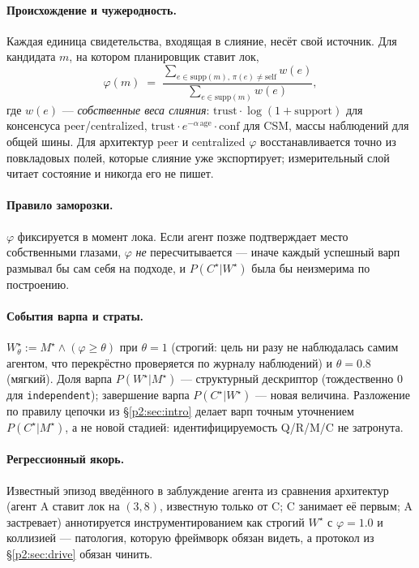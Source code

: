 \documentclass{article}
\newcommand{\method}[1]{\texttt{#1}}
\newcommand{\wstar}{W^{\star}}
\newcommand{\mstar}{M^{\star}}
\newcommand{\cstar}{C^{\star}}
\begin{document}
\paragraph{Происхождение и чужеродность.} Каждая единица
свидетельства, входящая в слияние, несёт свой источник. Для
кандидата $m$, на котором планировщик ставит лок,
\[
\varphi(m) \;=\;
\frac{\sum_{e\in\mathrm{supp}(m),\,\pi(e)\neq\mathrm{self}} w(e)}
     {\sum_{e\in\mathrm{supp}(m)} w(e)},
\]
где $w(e)$ --- \emph{собственные веса слияния}: $\text{trust}\cdot
\log(1{+}\text{support})$ для консенсуса peer/centralized,
$\text{trust}\cdot e^{-\alpha\,\text{age}}\cdot\text{conf}$ для CSM,
массы наблюдений для общей шины. Для архитектур peer и centralized
$\varphi$ восстанавливается точно из повкладовых полей, которые
слияние уже экспортирует; измерительный слой читает состояние и
никогда его не пишет.

\paragraph{Правило заморозки.} $\varphi$ фиксируется в момент лока.
Если агент позже подтверждает место собственными глазами, $\varphi$
\emph{не} пересчитывается --- иначе каждый успешный варп размывал бы
сам себя на подходе, и $P(\cstar|\wstar)$ была бы неизмерима по
построению.

\paragraph{События варпа и страты.} $\wstar_\theta := \mstar \wedge
(\varphi\ge\theta)$ при $\theta{=}1$ (строгий: цель ни разу не
наблюдалась самим агентом, что перекрёстно проверяется по журналу
наблюдений) и $\theta{=}0.8$ (мягкий). Доля варпа $P(\wstar|\mstar)$
--- структурный дескриптор (тождественно $0$ для
\method{independent}); завершение варпа $P(\cstar|\wstar)$ --- новая
величина. Разложение по правилу цепочки из \S\ref{p2:sec:intro} делает
варп точным уточнением $P(\cstar|\mstar)$, а не новой стадией:
идентифицируемость Q/R/M/C не затронута.

\paragraph{Регрессионный якорь.} Известный эпизод введённого в
заблуждение агента из сравнения архитектур (агент A ставит лок на
$(3,8)$, известную только от C; C занимает её первым; A застревает)
аннотируется инструментированием как строгий $\wstar$ с
$\varphi=1.0$ и коллизией --- патология, которую фреймворк обязан
видеть, а протокол из \S\ref{p2:sec:drive} обязан чинить.
\end{document}
